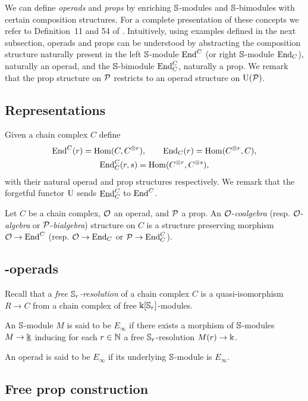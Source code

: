 We can define \textit{operads} and \textit{props} by enriching $\S$-modules and $\S$-bimodules with certain composition structures.
For a complete presentation of these concepts we refer to Definition~11 and 54 of \cite{markl2008props}.
Intuitively, using examples defined in the next subsection, operads and props can be understood by abstracting the composition structure naturally present in the left $\S$-module $\End^C$ (or right $\S$-module $\End_C$), naturally an operad, and the $\S$-bimodule $\End^C_C$, naturally a prop.
We remark that the prop structure on $\cP$ restricts to an operad structure on $\forget(\cP)$.

\subsection{Representations}

Given a chain complex $C$ define
\begin{gather*}
\End^C(r) = \Hom(C, C^{\ot r}), \qquad
\End_C(r) = \Hom(C^{\ot r}, C), \\
\End^C_C(r, s) = \Hom(C^{\ot r}, C^{\ot s}),
\end{gather*}
with their natural operad and prop structures respectively.
We remark that the forgetful functor $\forget$ sends $\End^C_C$ to $\End^C$.

Let $C$ be a chain complex, $\cO$ an operad, and $\cP$ a prop.
An $\cO$-\textit{coalgebra} (resp. $\cO$-\textit{algebra} or $\cP$-\textit{bialgebra}) structure on $C$ is a structure preserving morphism $\cO \to \End^C$ (resp. $\cO \to \End_C$ or $\cP \to \End_C^C$).

\subsection{\pdfEinfty-operads}

Recall that a \textit{free $\S_r$-resolution} of a chain complex $C$ is a quasi-isomorphism $R \to C$ from a chain complex of free $\k[\S_r]$-modules.

An $\S$-module $M$ is said to be $E_{\infty}$ if there exists a morphism of $\S$-modules $M \to \underline{\k}$ inducing for each $r \in \N$ a free $\S_r$-resolution $M(r) \to \k$.

An operad is said to be $E_{\infty}$ if its underlying $\S$-module is $E_\infty$.

\subsection{Free prop construction} \label{ss:free prop}

